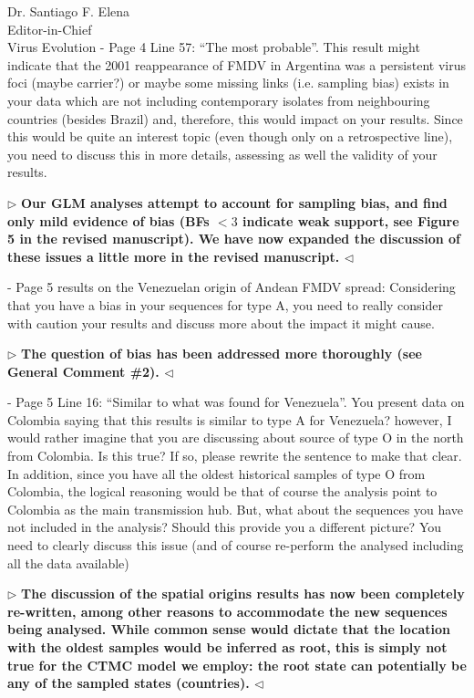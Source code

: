 \documentclass[12pt, a4paper]{letter} %
\newenvironment{reply}{$\triangleright$\bf}{$\triangleleft$}
\begin{document}
\begin{letter}{
	Dr. Santiago F. Elena\\
    Editor-in-Chief \\
    Virus Evolution
}
-       Page 4 Line 57: ``The most probable''. 
This result might indicate that the 2001 reappearance of FMDV in Argentina was a persistent virus foci (maybe carrier?) or maybe some missing links (i.e. sampling bias) exists in your data which are not including contemporary isolates from neighbouring countries (besides Brazil) and, therefore, this would impact on your results. 
Since this would be quite an interest topic (even though only on a retrospective line), you need to discuss this in more details, assessing as well the validity of your results.

\begin{reply}
Our GLM analyses attempt to account for sampling bias, and find only mild evidence of bias (BFs $<3$ indicate weak support, see Figure 5 in the revised manuscript). 
We have now expanded the discussion of these issues a little more in the revised manuscript.
\end{reply}

-       Page 5 results on the Venezuelan origin of Andean FMDV spread: 
Considering that you have a bias in your sequences for type A, you need to really consider with caution your results and discuss more about the impact it might cause.

\begin{reply}
The question of bias has been addressed more thoroughly (see General Comment \#2).
\end{reply}

-       Page 5 Line 16: ``Similar to what was found for Venezuela''. 
You present data on Colombia saying that this results is similar to type A for Venezuela? however, I would rather imagine that you are discussing about source of type O in the north from Colombia. 
Is this true? If so, please rewrite the sentence to make that clear. 
In addition, since you have all the oldest historical samples of type O from Colombia, the logical reasoning would be that of course the analysis point to Colombia as the main transmission hub. 
But, what about the sequences you have not included in the analysis? 
Should this provide you a different picture? 
You need to clearly discuss this issue (and of course re-perform the analysed including all the data available)

\begin{reply}
The discussion of the spatial origins results has now been completely re-written, among other reasons to accommodate the new sequences being analysed.
While common sense would dictate that the location with the oldest samples would be inferred as root, this is simply not true for the CTMC model we employ: the root state can potentially be any of the sampled states (countries).
\end{reply}


\end{letter}
\end{document}
